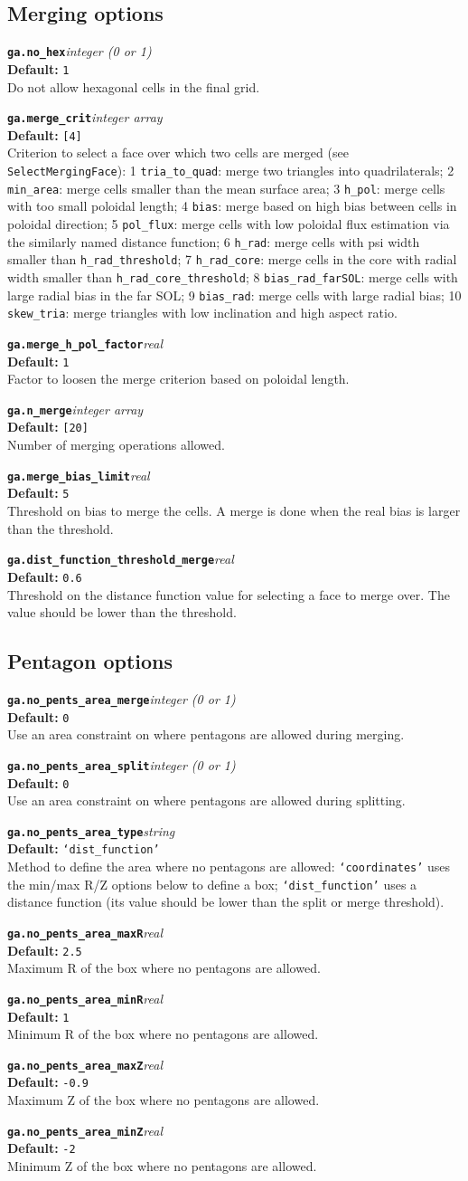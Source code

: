 \documentclass[10pt,a4paper]{article}
\newcommand{\sw}[4]{%
  \par\vspace{0.7em}%
  \begin{minipage}{\linewidth}\raggedright
    \textbf{\texttt{#1}}\hfill\textit{#2}\\[0.1em]
    \textbf{Default:} #3\\[0.1em]
    #4\par
    \vspace{0.3em}{\color{swgrey}\hrule}
  \end{minipage}\par}
\begin{document}
\subsection*{Merging options}
\sw{ga.no_hex}{integer (0 or 1)}{\texttt{1}}{Do not allow hexagonal cells in the final grid.}
\sw{ga.merge_crit}{integer array}{\texttt{[4]}}{Criterion to select a face over which two cells are merged (see \texttt{SelectMergingFace}):
1 \texttt{tria\_to\_quad}: merge two triangles into quadrilaterals;
2 \texttt{min\_area}: merge cells smaller than the mean surface area;
3 \texttt{h\_pol}: merge cells with too small poloidal length;
4 \texttt{bias}: merge based on high bias between cells in poloidal direction;
5 \texttt{pol\_flux}: merge cells with low poloidal flux estimation via the similarly named distance function;
6 \texttt{h\_rad}: merge cells with psi width smaller than \texttt{h\_rad\_threshold};
7 \texttt{h\_rad\_core}: merge cells in the core with radial width smaller than \texttt{h\_rad\_core\_threshold};
8 \texttt{bias\_rad\_farSOL}: merge cells with large radial bias in the far SOL;
9 \texttt{bias\_rad}: merge cells with large radial bias;
10 \texttt{skew\_tria}: merge triangles with low inclination and high aspect ratio.}
\sw{ga.merge_h_pol_factor}{real}{\texttt{1}}{Factor to loosen the merge criterion based on poloidal length.}
\sw{ga.n_merge}{integer array}{\texttt{[20]}}{Number of merging operations allowed.}
\sw{ga.merge_bias_limit}{real}{\texttt{5}}{Threshold on bias to merge the cells. A merge is done when the real bias is larger than the threshold.}
\sw{ga.dist_function_threshold_merge}{real}{\texttt{0.6}}{Threshold on the distance function value for selecting a face to merge over. The value should be lower than the threshold.}

\subsection*{Pentagon options}
\sw{ga.no_pents_area_merge}{integer (0 or 1)}{\texttt{0}}{Use an area constraint on where pentagons are allowed during merging.}
\sw{ga.no_pents_area_split}{integer (0 or 1)}{\texttt{0}}{Use an area constraint on where pentagons are allowed during splitting.}
\sw{ga.no_pents_area_type}{string}{\texttt{`dist\_function'}}{Method to define the area where no pentagons are allowed: \texttt{`coordinates'} uses the min/max R/Z options below to define a box; \texttt{`dist\_function'} uses a distance function (its value should be lower than the split or merge threshold).}
\sw{ga.no_pents_area_maxR}{real}{\texttt{2.5}}{Maximum R of the box where no pentagons are allowed.}
\sw{ga.no_pents_area_minR}{real}{\texttt{1}}{Minimum R of the box where no pentagons are allowed.}
\sw{ga.no_pents_area_maxZ}{real}{\texttt{-0.9}}{Maximum Z of the box where no pentagons are allowed.}
\sw{ga.no_pents_area_minZ}{real}{\texttt{-2}}{Minimum Z of the box where no pentagons are allowed.}
\end{document}
